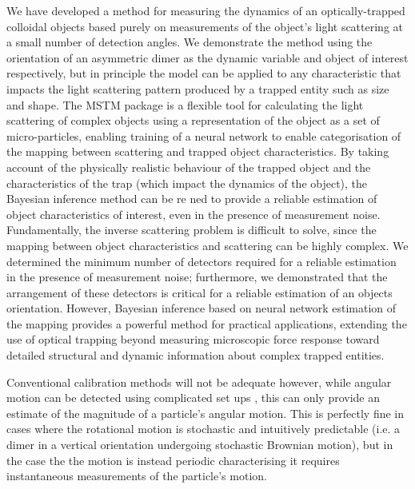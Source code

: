 We have developed a method for measuring the dynamics of an 
optically-trapped colloidal objects based purely on 
measurements of the object's light scattering at a small 
number of detection angles. We demonstrate the method using 
the orientation of an asymmetric dimer as the dynamic variable 
and object of interest respectively, but in principle the 
model can be applied to any characteristic that impacts the 
light scattering pattern produced by a trapped entity such 
as size and shape. The MSTM package is a flexible tool for 
calculating the light scattering of complex objects using a 
representation of the object as a set of micro-particles, 
enabling training of a neural network to enable categorisation 
of the mapping between scattering and trapped object 
characteristics. By taking account of the physically realistic 
behaviour of the trapped object and the characteristics of 
the trap (which impact the dynamics of the object), the 
Bayesian inference method can be re ned to provide a reliable 
estimation of object characteristics of interest, even in the 
presence of measurement noise. Fundamentally, the inverse 
scattering problem is difficult to solve, since the mapping 
between object characteristics and scattering can be highly 
complex. We determined the minimum number of detectors 
required for a reliable estimation in the presence of 
measurement noise; furthermore, we demonstrated that the 
arrangement of these detectors is critical for a reliable 
estimation of an objects orientation. However, Bayesian 
inference based on neural network estimation of the mapping 
provides a powerful method for practical applications, 
extending the use of optical trapping beyond measuring 
microscopic force response toward detailed structural and 
dynamic information about complex trapped entities. 

Conventional calibration methods will not be adequate however, while
angular motion can be detected using complicated set ups \cite{Bang2020},
this can only provide an estimate of the magnitude of a particle's 
angular motion. This is perfectly fine in cases where the rotational
motion is stochastic and intuitively predictable (i.e. a dimer in a
vertical orientation undergoing stochastic Brownian motion), but in 
the case the the motion is instead periodic characterising it requires
instantaneous measurements of the particle's motion. 

